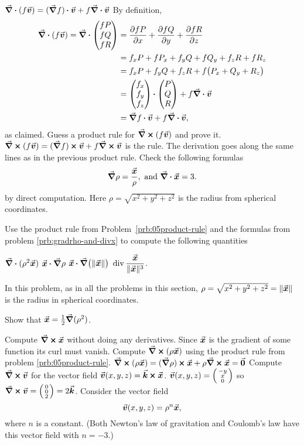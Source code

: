 \documentclass{amsart}
\begin{document}
\subprob $\nab\dpp(f\vv) = (\nab f)\dpp\vv + f \nab\dpp\vv$ %
\answer
By definition,
\begin{align*}
  \nab\dpp(f\vv) = \nab \dpp \vek fP\\fQ \\fR\tor
  &= \pdd{fP}x + \pdd{fQ}y + \pdd{fR}z  \\
  &= f_x P + fP_x + f_yQ + fQ_y + f_z R + fR_z\\
  &= f_x P +f_y Q + f_z R + f\bigl(P_x+Q_y+R_z\bigr) \\
  &= \vek f_x\\ f_y\\ f_z\tor \dpp \vek P\\Q\\R\tor + f \nab\dpp\vv \\
  &= \nab f\dpp \vv + f\nab \dpp\vv,
\end{align*}
as claimed.
\endanswer
\subprob Guess a product rule for $\nab\cp(f\vv)$ and prove it. %
\answer
$\nab\cp(f\vv) = (\nab f)\cp\vv + f\nab\cp\vv$ is the rule.
The derivation goes along the same lines as in the previous product rule.
\endanswer
\problem \label{prb:gradrho-and-divx} Check the following %
formulas
\[
\nab \rho = \frac{\vx} {\rho}, \text{ and }
\nab\dpp \vx = 3.
\]
by direct computation.
Here $\rho = \sqrt{x^2 + y^2 + z^2}$ is the radius from spherical
coordinates.

\problem Use the product rule from Problem~\ref{prb:05product-rule} and %
the formulas from problem \ref{prb:gradrho-and-divx} to compute the
following quantities

\subprob $\nab\dpp(\rho^2\vx)$ \qquad
\subprob $\vx\dpp\nab\rho$ \qquad
\subprob $\vx\dpp\nab\bigl(\|\vx\|\bigr)$ \qquad
\subprob $\DS \div \frac{\vx} {\|\vx\|^3}$.  



\problem \label{prb:x-no-curl} %
In this problem, as in all the problems in this section,
$\rho = \sqrt{x^2+y^2+z^2} = \|\vx\|$
is the radius in spherical coordinates.

\subprob Show that $\vx = \frac12 \nab(\rho^2)$. %

\subprob Compute $\nab\cp\vx$ without doing any derivatives. %
\answer
Since $\vx$ is the gradient of some function its curl must vanish.
\endanswer
\subprob Compute $\nab\cp(\rho\vx)$ using the product rule from %
problem \ref{prb:05product-rule}.
\answer
$\nab\cp(\rho\vx) = (\nab \rho)\cp \vx + \rho \nab\cp\vx = \vvv0$
\endanswer
\problem Compute $\nab\cp\vv$ for the vector field %
$\vv(x, y, z) = \vk\cp\vx$.
\answer
$\vv(x, y, z) = \tvek -y \\x \\ 0\ttor$
so $\nab\cp\vv = \tvek 0\\0\\2\ttor = 2\vk$.
\endanswer
\problem\label{prb:05div-rho-n-x} Consider the vector field
\[
\vv(x, y, z) = \rho^n \vx,
\]
where $n$ is a constant.  (Both Newton's law of gravitation
and Coulomb's law have this vector field with $n=-3$.)
\end{document}
